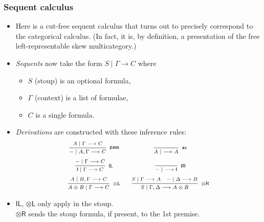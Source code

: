 \documentclass[10pt,t]{beamer}
\newcommand{\I}{\mathsf{I}}
\newcommand{\ot}{\otimes}
\newcommand{\n}{{-}}
\newcommand{\ax}{\mathsf{ax}}
\newcommand{\uf}{\mathsf{pass}}
\newcommand{\IL}{\I\mathsf{L}}
\newcommand{\otL}{\ot\mathsf{L}}
\newcommand{\IR}{\I\mathsf{R}}
\newcommand{\otR}{\ot\mathsf{R}}
\newcommand{\scut}{\mathsf{scut}}
\newcommand{\ccut}{\mathsf{ccut}}
\renewcommand{\vdash}{\longrightarrow}
\begin{document}
\begin{frame}

\frametitle{Sequent calculus}

\begin{itemize}

\item Here is a cut-free sequent calculus that turns out to precisely
  correspond to the categorical calculus. (In fact, it is, by
  definition, a presentation of the free left-representable skew
  multicategory.)

\item \emph{Sequents} now take the form $S \mid \Gamma \vdash C$
  where
\begin{itemize}
\item $S$ (stoup) is an optional formula,
\item $\Gamma$ (context) is a list of formulae,
\item $C$ is a single formula.
\end{itemize}

\item \emph{Derivations} are constructed with these inference rules:
\[
\scriptsize
\begin{array}{c@{\quad \quad}c}
\infer[\uf]{\n \mid A, \Gamma \vdash C}{
  A \mid \Gamma \vdash C
}
&
\infer[\ax]{A \mid ~\vdash A}{
}
\\[6pt]
\infer[\IL]{\I \mid \Gamma \vdash C}{
  \n \mid \Gamma \vdash C
}
&
\infer[\IR]{\n \mid ~ \vdash \I}{
}
\\[6pt]
\infer[\otL]{A \ot B \mid \Gamma \vdash C}{
  A \mid B, \Gamma \vdash C
}
&
\infer[\otR]{S \mid \Gamma, \Delta \vdash A \otimes B}{
  S \mid \Gamma \vdash A
  &
  \n \mid \Delta \vdash B
}
\end{array}
\]

\item $\IL$, $\otL$ only apply in the stoup. \\ 
 $\otR$ sends the stoup formula, if present, to the
  1st premise.


\end{itemize}


\end{frame}
\end{document}
